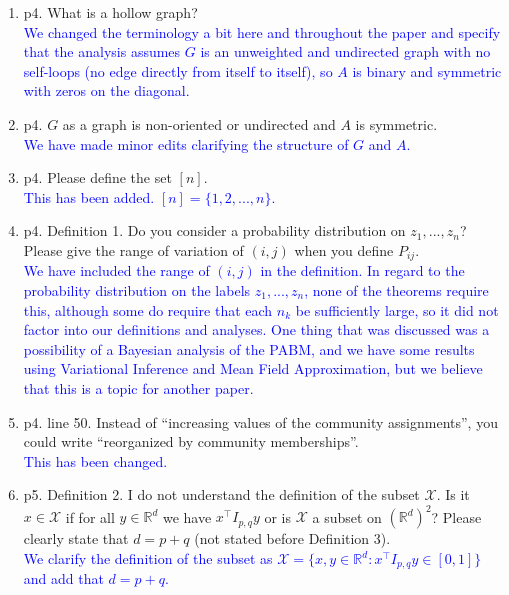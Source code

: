 \documentclass[
]{article}
\begin{document}
\begin{enumerate}
\def\labelenumi{\arabic{enumi}.}
\item
  p4. What is a hollow graph?\\
  \textcolor{blue}{
  We changed the terminology a bit here and throughout the paper 
  and specify that the analysis assumes $G$ is an unweighted and undirected graph with no self-loops (no edge directly from itself to itself), 
  so $A$ is binary and symmetric with zeros on the diagonal. 
  }
\item
  p4. \(G\) as a graph is non-oriented or undirected and \(A\) is
  symmetric.\\
  \textcolor{blue}{
  We have made minor edits clarifying the structure of $G$ and $A$. 
  }
\item
  p4. Please define the set \([n]\).\\
  \textcolor{blue}{
  This has been added. $[n] = \{1, 2, ..., n\}$. 
  }
\item
  p4. Definition 1. Do you consider a probability distribution on
  \(z_1, ..., z_n\)? Please give the range of variation of \((i, j)\)
  when you define \(P_{ij}\).\\
  \textcolor{blue}{
  We have included the range of $(i, j)$ in the definition. 
  In regard to the probability distribution on the labels $z_1, ..., z_n$, none of the theorems require this, although some do require that each $n_k$ be sufficiently large, so it did not factor into our definitions and analyses. 
  One thing that was discussed was a possibility of a Bayesian analysis of the PABM, and we have some results using Variational Inference and Mean Field Approximation, but we believe that this is a topic for another paper. 
  }
\item
  p4. line 50. Instead of ``increasing values of the community
  assignments'', you could write ``reorganized by community
  memberships''.\\
  \textcolor{blue}{
  This has been changed.
  }
\item
  p5. Definition 2. I do not understand the definition of the subset
  \(\mathcal{X}\). Is it \(x \in \mathcal{X}\) if for all
  \(y \in \mathbb{R}^d\) we have \(x^\top I_{p,q} y\) or is
  \(\mathcal{X}\) a subset on \((\mathbb{R}^d)^2\)? Please clearly state
  that \(d = p + q\) (not stated before Definition 3).\\
  \textcolor{blue}{
  We clarify the definition of the subset as $\mathcal{X} = \{x, y \in \mathbb{R}^d : x^\top I_{p, q} y \in [0, 1]\}$ and add that $d = p + q$. 
}
\end{enumerate}
\end{document}
